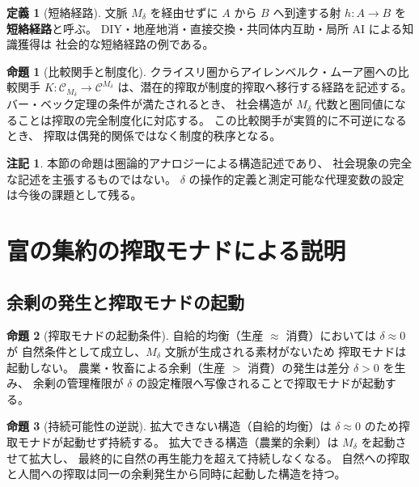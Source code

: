 \documentclass[11pt,a4paper]{ltjsarticle}
\newcommand{\Mdelta}{M_\delta}
\theoremstyle{definition}
\newtheorem{definition}{定義}[section]
\newtheorem{proposition}{命題}[section]
\newtheorem{remark}{注記}[section]
\begin{document}
\begin{definition}[短絡経路]
文脈 $\Mdelta$ を経由せずに $A$ から $B$ へ到達する射 $h: A \to B$ を
\textbf{短絡経路}と呼ぶ。
DIY・地産地消・直接交換・共同体内互助・局所 AI による知識獲得は
社会的な短絡経路の例である。
\end{definition}

\begin{proposition}[比較関手と制度化]
クライスリ圏からアイレンベルク・ムーア圏への比較関手
$K: \mathcal{C}_{\Mdelta} \to \mathcal{C}^{\Mdelta}$
は、潜在的搾取が制度的搾取へ移行する経路を記述する。
バー・ベック定理の条件が満たされるとき、
社会構造が $\Mdelta$ 代数と圏同値になることは搾取の完全制度化に対応する。
この比較関手が実質的に不可逆になるとき、
搾取は偶発的関係ではなく制度的秩序となる。
\end{proposition}

\begin{remark}
本節の命題は圏論的アナロジーによる構造記述であり、
社会現象の完全な記述を主張するものではない。
$\delta$ の操作的定義と測定可能な代理変数の設定は今後の課題として残る。
\end{remark}

\section{富の集約の搾取モナドによる説明}

\subsection{余剰の発生と搾取モナドの起動}

\begin{proposition}[搾取モナドの起動条件]
自給的均衡（生産 $\approx$ 消費）においては $\delta \approx 0$ が
自然条件として成立し、$\Mdelta$ 文脈が生成される素材がないため
搾取モナドは起動しない。
農業・牧畜による余剰（生産 $>$ 消費）の発生は差分 $\delta > 0$ を生み、
余剰の管理権限が $\delta$ の設定権限へ写像されることで搾取モナドが起動する。
\end{proposition}

\begin{proposition}[持続可能性の逆説]
拡大できない構造（自給的均衡）は $\delta \approx 0$ のため搾取モナドが起動せず持続する。
拡大できる構造（農業的余剰）は $\Mdelta$ を起動させて拡大し、
最終的に自然の再生能力を超えて持続しなくなる。
自然への搾取と人間への搾取は同一の余剰発生から同時に起動した構造を持つ。
\end{proposition}
\end{document}
